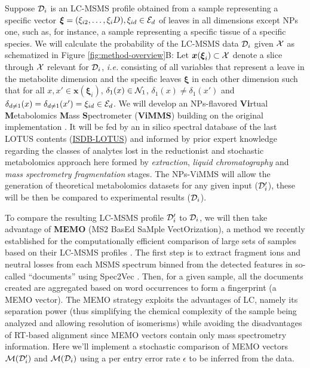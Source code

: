 \documentclass[
11pt, %
oneside, %
english, %
singlespacing, %
headsepline, %
chapterinoneline, %
]{MastersDoctoralThesis} %
\def\E{\mathbb{E}}
\def\x{\boldsymbol{x}}
\def\bxi{\boldsymbol{\xi}}
\def\E{{\cal E}}
\def\N{{\cal N}}
\def\M{{\cal M}}
\def\X{{\cal X}}
\def\D{{\cal D}}
\begin{document}
Suppose $\D_i$ is an LC-MSMS profile obtained from a sample representing a specific vector $\bxi=(\xi_{i2}, \ldots, \xi_i{D}), \xi_{id} \in \E_d$ of leaves in all dimensions except NPs one, such as, for instance, a sample representing a specific tissue of a specific species. We will calculate the probability of the LC-MSMS data $\D_i$ given $\X$ as schematized in Figure \ref{fig:method-overview}B: Let $\x(\bxi_i) \subset \X$ denote a slice through $\X$ relevant for $\D_i$, \textit{i.e.} consisting of all variables that represent a leave in the metabolite dimension and the specific leaves $\bxi$ in each other dimension such that for all $x,x' \in \x(\bxi_i)$, $\delta_1(x) \in \N_1$, $\delta_1(x) \neq \delta_1(x')$ and $\delta_{d \neq 1}(x) =\delta_{d \neq 1}(x') = \xi_{id} \in \E_d$. We will develop an NPs-flavored \textbf{Vi}rtual \textbf{M}etabolomics \textbf{M}ass \textbf{S}pectrometer (\textbf{ViMMS}) building on the original implementation \cite{wandy_2019}. It will be fed by an in silico spectral database of the last LOTUS contents (\href{https://doi.org/10.5281/zenodo.8287341}{ISDB-LOTUS}) and informed by prior expert knowledge regarding the classes of analytes lost in the reductionist and stochastic metabolomics approach here formed by \textit{extraction}, \textit{liquid chromatography} and \textit{mass spectrometry fragmentation} stages. The NPs-ViMMS will allow the generation of theoretical metabolomics datasets for any given input ($\D_i'$), these will be then be compared to experimental results ($\D_i$).

To compare the resulting LC-MSMS profile $\D_i'$ to $\D_i$, we will then take advantage of \textbf{MEMO} (MS2 BasEd SaMple VectOrization), a method we recently established for the computationally efficient comparison of large sets of samples based on their LC-MSMS profiles \cite{gaudry_2022}. The first step is to extract fragment ions and neutral losses from each MSMS spectrum binned from the detected features in so-called “documents” using Spec2Vec \cite{huber_2021}. Then, for a given sample, all the documents created are aggregated based on word occurrences to form a fingerprint (a MEMO vector). The MEMO strategy exploits the advantages of LC, namely its separation power (thus simplifying the chemical complexity of the sample being analyzed and allowing resolution of isomerisms) while avoiding the disadvantages of RT-based alignment since MEMO vectors contain only mass spectrometry information. Here we'll implement a stochastic comparison of MEMO vectors $\M(\D_i')$ and $\M(\D_i)$ using a per entry error rate $\epsilon$ to be inferred from the data. 
\end{document}
